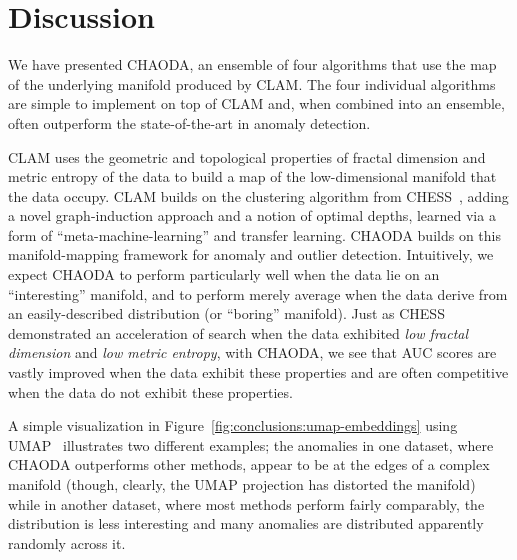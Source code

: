 \section{Discussion}
\label{sec:discussion}

We have presented CHAODA, an ensemble of four algorithms that use the map of the underlying manifold produced by CLAM\@.
The four individual algorithms are simple to implement on top of CLAM and, when combined into an ensemble, often outperform the state-of-the-art in anomaly detection.

CLAM uses the geometric and topological properties of fractal dimension and metric entropy of the data to build a map of the low-dimensional manifold that the data occupy.
CLAM builds on the clustering algorithm from CHESS~\cite{ishaq2019clustered}, adding a novel graph-induction approach and a notion of optimal depths, learned via a form of ``meta-machine-learning'' and transfer learning.
CHAODA builds on this manifold-mapping framework for anomaly and outlier detection.
Intuitively, we expect CHAODA to perform particularly well when the data lie on an ``interesting'' manifold, and to perform merely average when the data derive from an easily-described distribution (or ``boring'' manifold).
Just as CHESS demonstrated an acceleration of search when the data exhibited \emph{low fractal dimension} and \emph{low metric entropy}, with CHAODA, we see that AUC scores are vastly improved when the data exhibit these properties and are often competitive when the data do not exhibit these properties.


A simple visualization in Figure~\ref{fig:conclusions:umap-embeddings} using UMAP~\cite{mcinnes2018umap} illustrates two different examples; the anomalies in one dataset, where CHAODA outperforms other methods, appear to be at the edges of a complex manifold (though, clearly, the UMAP projection has distorted the manifold) while in another dataset, where most methods perform fairly comparably, the distribution is less interesting and many anomalies are distributed apparently randomly across it.

